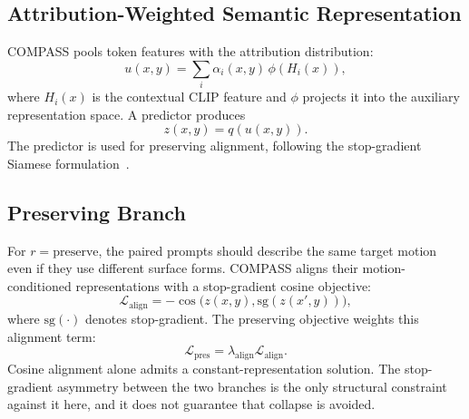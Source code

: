 \subsection{Attribution-Weighted Semantic Representation}
COMPASS pools token features with the attribution distribution:
\begin{equation}
    u(x,y)=\sum_i \alpha_i(x,y)\,\phi(H_i(x)),
\end{equation}
where $H_i(x)$ is the contextual CLIP feature and $\phi$ projects it into the
auxiliary representation space. A predictor produces
\begin{equation}
    z(x,y)=q(u(x,y)).
\end{equation}
The predictor is used for preserving alignment, following the stop-gradient
Siamese formulation~\cite{chen2021exploring}.

\subsection{Preserving Branch}
For $r=\mathrm{preserve}$, the paired prompts should describe the same target
motion even if they use different surface forms. COMPASS aligns their
motion-conditioned representations with a stop-gradient cosine objective:
\begin{equation}
    \mathcal{L}_{\mathrm{align}}
    =-\cos\bigl(z(x,y),\mathrm{sg}(z(x',y))\bigr),
\end{equation}
where $\mathrm{sg}(\cdot)$ denotes stop-gradient. The preserving objective
weights this alignment term:
\begin{equation}
    \mathcal{L}_{\mathrm{pres}}
    =
    \lambda_{\mathrm{align}}\mathcal{L}_{\mathrm{align}} .
\end{equation}
Cosine alignment alone admits a constant-representation solution. The
stop-gradient asymmetry between the two branches is the only structural
constraint against it here, and it does not guarantee that collapse is
avoided.

